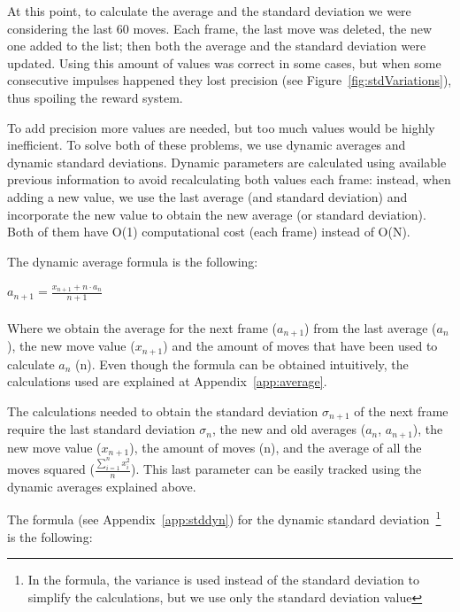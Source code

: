 At this point, to calculate the average and the standard deviation we were considering the last 60 moves. Each frame, the last move was deleted, the new one added to the list; then both the average and the standard deviation were updated. Using this amount of values was correct in some cases, but when some consecutive impulses happened they lost precision (see Figure~\ref{fig:stdVariations}), thus spoiling the reward system.

To add precision more values are needed, but too much values would be highly inefficient. To solve both of these problems, we use dynamic averages and dynamic standard deviations. Dynamic parameters are calculated using available previous information to avoid recalculating both values each frame: instead, when adding a new value, we use the last average (and standard deviation) and incorporate the new value to obtain the new average (or standard deviation). Both of them have O(1) computational cost (each frame) instead of O(N).

The dynamic average formula is the following:

\vspace{5mm}

$ {\displaystyle a_{n+1}=\frac{x_{n+1}+n\cdot a_n}{n+1}} $\\\\

Where we obtain the average for the next frame ($a_{n+1}$) from the last average ($a_{n}$), the new move value ($x_{n+1}$) and the amount of moves that have been used to calculate $a_{n}$ (n). Even though the formula can be obtained intuitively, the calculations used are explained at Appendix~\ref{app:average}.

\vspace{5mm}

The calculations needed to obtain the standard deviation $\sigma_{n+1}$ of the next frame require the last standard deviation $\sigma_{n}$, the new and old averages ($a_{n}$, $a_{n+1}$), the new move value ($x_{n+1}$), the amount of moves (n), and the average of all the moves squared ($\frac{\sum_{i=1}^{n}x_i^2}{n}$). This last parameter can be easily tracked using the dynamic averages explained above. 

The formula (see Appendix~\ref{app:stddyn}) for the dynamic standard deviation~\footnote{In the formula, the variance is used instead of the standard deviation to simplify the calculations, but we use only the standard deviation value} is the following:

